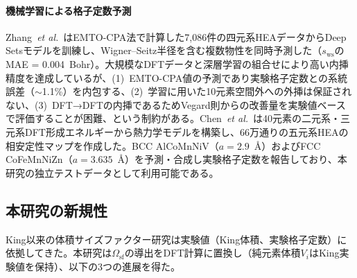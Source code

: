 \documentclass[5p,10pt]{elsarticle}
\begin{document}
\paragraph{機械学習による格子定数予測}
Zhang~\emph{et al.}~\cite{Zhang2022}はEMTO-CPA法で計算した7,086件の四元系HEAデータからDeep Setsモデルを訓練し、Wigner--Seitz半径を含む複数物性を同時予測した（$s_{\text{ws}}$のMAE = 0.004~Bohr）。大規模なDFTデータと深層学習の組合せにより高い内挿精度を達成しているが、(1)~EMTO-CPA値の予測であり実験格子定数との系統誤差（$\sim$1.1\%）を内包する、(2)~学習に用いた10元素空間外への外挿は保証されない、(3)~DFT→DFTの内挿であるためVegard則からの改善量を実験値ベースで評価することが困難、という制約がある。Chen~\emph{et al.}~\cite{Chen2023}は40元素の二元系・三元系DFT形成エネルギーから熱力学モデルを構築し、66万通りの五元系HEAの相安定性マップを作成した。BCC AlCoMnNiV（$a = 2.9$~\AA{}）およびFCC CoFeMnNiZn（$a = 3.635$~\AA{}）を予測・合成し実験格子定数を報告しており、本研究の独立テストデータとして利用可能である。

\subsection{本研究の新規性}

King以来の体積サイズファクター研究は実験値（King体積、実験格子定数）に依拠してきた。本研究は$\Omega_\text{sf}$の導出をDFT計算に置換し（純元素体積$V_i$はKing実験値を保持）、以下の3つの進展を得た。
\end{document}
